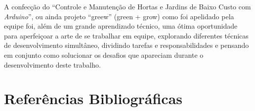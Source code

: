 \documentclass[a4paper,12pt]{article}
\begin{document}
A confecção do ``Controle e Manutenção de Hortas e Jardins de Baixo Custo com \textit{Arduino}”, ou ainda projeto ``greew” (green + grow) como foi apelidado pela equipe foi, além de um grande aprendizado técnico, uma ótima oportunidade para aperfeiçoar a arte de se trabalhar em equipe, explorando diferentes técnicas de desenvolvimento simultâneo, dividindo tarefas e responsabilidades e pensando em conjunto como solucionar os desafios que apareciam durante o desenvolvimento deste trabalho.



%
\renewcommand\refname{}


\newpage
\section{Referências Bibliográficas}
\renewcommand\refname{}

%
%
\end{document}
